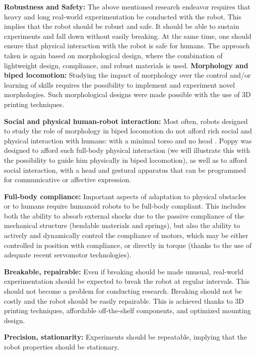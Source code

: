 \textbf{Robustness and Safety:} The above mentioned research endeavor requires that heavy and long real-world experimentation be conducted with the robot.
This implies that the robot should be robust and safe.
It should be able to sustain experiments and fall down without easily breaking.
At the same time, one should ensure that physical interaction with the robot is safe for humans.
The approach taken is again based on morphological design, where the combination of lightweight design, compliance, and robust materials is used.
\textbf{Morphology and biped locomotion:} Studying the impact of morphology over the control and/or learning of skills requires the possibility to implement and experiment novel morphologies.
Such morphological designs were made possible with the use of 3D printing techniques.

\textbf{Social and physical human-robot interaction:} Most often, robots designed to study the role of morphology in biped locomotion do not afford rich social and physical interaction with humans: with a minimal torso and no head \cite{collins2001three}\cite{niiyama2010athlete}.
Poppy was designed to afford such full-body physical interaction (we will illustrate this with the possibility to guide him physically in biped locomotion), as well as to afford social interaction, with a head and gestural apparatus that can be programmed for communicative or affective expression.

\textbf{Full-body compliance:} Important aspects of adaptation to physical obstacles or to humans require humanoid robots to be full-body compliant.
This includes both the ability to absorb external shocks due to the passive compliance of the mechanical structure (bendable materials and springs), but also the ability to actively and dynamically control the compliance of motors, which may be either controlled in position with compliance, or directly in torque (thanks to the use of adequate recent servomotor technologies).



\textbf{Breakable, repairable:} Even if breaking should be made unusual, real-world experimentation should be expected to break the robot at regular intervals.
This should not become a problem for conducting research.
Breaking should not be costly and the robot should be easily repairable.
This is achieved thanks to 3D printing techniques, affordable off-the-shelf components, and optimized mounting design.

\textbf{Precision, stationarity:} Experiments should be repeatable, implying that the robot properties should be stationary.

